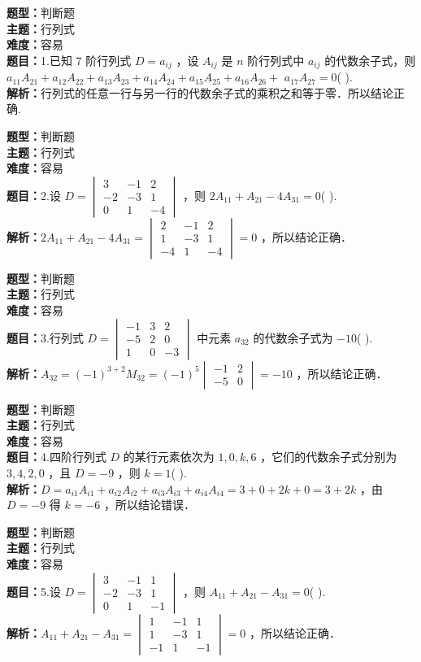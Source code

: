 \documentclass{ctexart}
\newenvironment{question}[5]{%
	\noindent\textbf{题型：}#1\\
	\textbf{主题：}#2\\
	\textbf{难度：}#3\\
	\textbf{题目：}#4\\
	\textbf{解析：}#5\\
	\vspace{1em}
}{}
\begin{document}
	\begin{question}
		{判断题}
		{行列式}
		{容易}
		{1.已知 7 阶行列式 $D=a_{i j}$ ，设 $A_{i j}$ 是 $n$ 阶行列式中 $a_{i j}$ 的代数余子式，则 $a_{11} A_{21}+a_{12} A_{22}+a_{13} A_{23}+a_{14} A_{24}+a_{15} A_{25}+a_{16} A_{26}+$ $a_{17} A_{27}=0$(  ).}
		{行列式的任意一行与另一行的代数余子式的乘积之和等于零．所以结论正确.}
	\end{question}	
	
	\begin{question}
		{判断题}
		{行列式}
		{容易}
		{2.设 $D=\begin{vmatrix}3 & -1 & 2 \\ -2 & -3 & 1 \\ 0 & 1 & -4\end{vmatrix}$ ，则 $2 A_{11}+A_{21}-4 A_{31}=0$(  ).}
		{$2 A_{11}+A_{21}-4 A_{31}=\begin{vmatrix}2 & -1 & 2 \\ 1 & -3 & 1 \\ -4 & 1 & -4\end{vmatrix}=0$ ，所以结论正确．}
	\end{question}
	
	\begin{question}
		{判断题}
		{行列式}
		{容易}
		{3.行列式 $D=\begin{vmatrix}-1 & 3 & 2 \\ -5 & 2 & 0 \\ 1 & 0 & -3\end{vmatrix}$ 中元素 $a_{32}$ 的代数余子式为 $-10$(  ).}
		{$A_{32}=(-1)^{3+2} M_{32}=(-1)^5 \begin{vmatrix}-1 & 2 \\ -5 & 0\end{vmatrix}=-10$ ，所以结论正确．}
	\end{question}
	
	\begin{question}
		{判断题}
		{行列式}
		{容易}
		{4.四阶行列式 $D$ 的某行元素依次为 $1,0,k,6$ ，它们的代数余子式分别为 $3,4,2,0$ ，且 $D=-9$ ，则 $k=1$(  ).}
		{$D=a_{i1} A_{i1}+a_{i2} A_{i2}+a_{i3} A_{i3}+a_{i4} A_{i4}=3+0+2k+0=3+2k$ ，由 $D=-9$ 得 $k=-6$ ，所以结论错误．}
	\end{question}
	
	\begin{question}
		{判断题}
		{行列式}
		{容易}
		{5.设 $D=\begin{vmatrix}3 & -1 & 1 \\ -2 & -3 & 1 \\ 0 & 1 & -1\end{vmatrix}$ ，则 $A_{11}+A_{21}-A_{31}=0$(  ).}
		{$A_{11}+A_{21}-A_{31}=\begin{vmatrix}1 & -1 & 1 \\ 1 & -3 & 1 \\ -1 & 1 & -1\end{vmatrix}=0$ ，所以结论正确．}
	\end{question}
	
\end{document}
